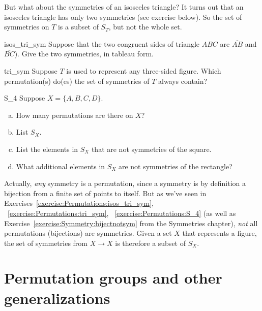 But what about the symmetries of an isosceles triangle? It turns out that an isosceles triangle has only two symmetries (see exercise below). 
So  the set of symmetries on $T$ is a subset of $S_T$, but not the whole set.

\begin{exercise}{isos_tri_sym}
Suppose that the two congruent sides of triangle $ABC$ are $\overline{AB}$ and $\overline{BC}$). Give the two symmetries, in tableau form.
\end{exercise}

\begin{exercise}{tri_sym}
Suppose $T$ is used to represent any three-sided figure.  
Which permutation(s) do(es) the set of symmetries of $T$ always contain?
\end{exercise}

\begin{exercise}{S_4}
Suppose $X = \{A, B, C, D\}$.
\begin{enumerate}[(a)]
\item
How many permutations are there on $X$?
\item
List $S_X$.
\item
List the elements in $S_X$ that are not symmetries of the square.
\item
What additional elements in $S_X$ are not symmetries of the rectangle?
\end{enumerate}
\end{exercise}

Actually, \emph{any} symmetry is a permutation, since a symmetry is by definition a bijection from a finite set of points to itself.  But as we've seen in Exercises~\ref{exercise:Permutations:isos_tri_sym}, ~\ref{exercise:Permutations:tri_sym}, ~\ref{exercise:Permutations:S_4} (as well as Exercise~\ref{exercise:Symmetry:bijectnotsym} from the Symmetries chapter), \emph{not} all permutations (bijections) are symmetries.  Given a set $X$ that represents a figure, the set of symmetries from $X \to X$ is therefore a subset of $S_X$.



\section{Permutation groups and other generalizations}
\label{sec:Permutations:GroupGeneralizations}

